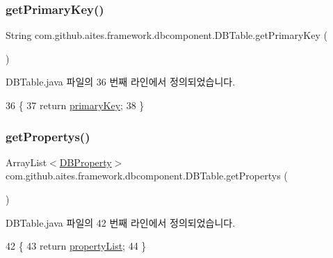 \subsubsection{\texorpdfstring{get\+Primary\+Key()}{getPrimaryKey()}}
{\footnotesize\ttfamily String com.\+github.\+aites.\+framework.\+dbcomponent.\+D\+B\+Table.\+get\+Primary\+Key (\begin{DoxyParamCaption}{ }\end{DoxyParamCaption})}



D\+B\+Table.\+java 파일의 36 번째 라인에서 정의되었습니다.


\begin{DoxyCode}
36                                  \{
37         \textcolor{keywordflow}{return} \mbox{\hyperlink{classcom_1_1github_1_1aites_1_1framework_1_1dbcomponent_1_1_d_b_table_a2a972d26ced2f37c2e83625617951e2a}{primaryKey}};
38     \}
\end{DoxyCode}
\mbox{\label{classcom_1_1github_1_1aites_1_1framework_1_1dbcomponent_1_1_d_b_table_aa6ae6fd1b997c0fa4f4cfad781082b2f}} 
\subsubsection{\texorpdfstring{get\+Propertys()}{getPropertys()}}
{\footnotesize\ttfamily Array\+List$<$\mbox{\hyperlink{classcom_1_1github_1_1aites_1_1framework_1_1dbcomponent_1_1_d_b_property}{D\+B\+Property}}$>$ com.\+github.\+aites.\+framework.\+dbcomponent.\+D\+B\+Table.\+get\+Propertys (\begin{DoxyParamCaption}{ }\end{DoxyParamCaption})}



D\+B\+Table.\+java 파일의 42 번째 라인에서 정의되었습니다.


\begin{DoxyCode}
42                                                \{
43         \textcolor{keywordflow}{return} \mbox{\hyperlink{classcom_1_1github_1_1aites_1_1framework_1_1dbcomponent_1_1_d_b_table_aaa1e58925c9f05a3cdc868defed1e0de}{propertyList}};
44     \}
\end{DoxyCode}
\mbox{\label{classcom_1_1github_1_1aites_1_1framework_1_1dbcomponent_1_1_d_b_table_aa5c66e9bc2059d53ed77e7b71c54e9ef}} 
